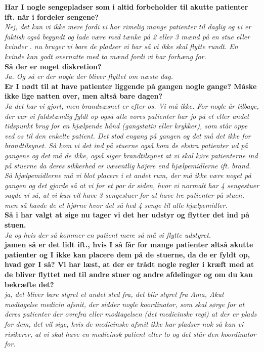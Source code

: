 \noindent
\textbf{Har I nogle sengepladser som i altid forbeholder til akutte patienter ift. når i fordeler sengene?}\\
\noindent
\textit{ Nej, det kan vi ikke mere fordi vi har rimelig mange patienter til daglig og vi er faktisk også begyndt og lade være med tænke på 2 eller 3 mænd på en stue eller kvinder . nu bruger vi bare de pladser vi har så vi ikke skal flytte rundt. En kvinde kan godt overnatte med to mænd fordi vi har forhæng for.}\\
\noindent
\textbf{Så der er noget diskretion?}\\
\noindent
\textit{Ja. Og så er der nogle der bliver flyttet om næste dag.}\\
\noindent
\textbf{Er I nødt til at have patienter liggende på gangen nogle gange? Måske ikke lige natten over, men altså bare dagen?}\\
\noindent
\textit{Ja det har vi gjort, men brandvæsnet er efter os. Vi må ikke. For nogle år tilbage, der var vi fuldstændig fyldt op også alle vores patienter har jo på et eller andet tidspunkt brug for en hjælpende hånd (gangstativ eller krykker), som står oppe ved os til den enkelte patient. Det stod engang på gangen og det må det ikke for brandtilsynet. Så kom vi det ind på stuerne også kom de ekstra patienter ud på gangene og det må de ikke, også siger brandtilsynet at vi skal køre patienterne ind på stuerne da deres sikkerhed er væsentlig højere end hjælpemidlerne ift. brand. Så hjælpemidlerne må vi blot placere i et andet rum, der må ikke være noget på gangen og det gjorde så at vi for et par år siden, hvor vi normalt har 4 sengestuer sagde vi så, at vi kun vil have 3 sengestuer for at have tre patienter på stuen, men så havde de et hjørne hvor det så hed 4 senge til alle hjælpemidler.}\\
\noindent
\textbf{Så i har valgt at sige nu tager vi det her udstyr og flytter det ind på stuen.}\\
\noindent
\textit{Ja og hvis der så kommer en patient mere så må vi flytte udstyret.}\\
\noindent
\textbf{jamen så er det lidt ift., hvis I så får for mange patienter altså akutte patienter og I ikke kan placere dem på de stuerne, da de er fyldt op, hvad gør I så? Vi har læst, at der er trådt nogle regler i kræft med at de bliver flyttet ned til andre stuer og andre afdelinger og om du kan bekræfte det?}\\
\noindent
\textit{ja, det bliver bare styret et andet sted fra, det blir styret fra Ama, Akut modtagelse medicin afsnit, der sidder nogle koordinator, som skal sørge for at deres patienter der ovrefra eller modtagelsen (det medicinske regi) at der er plads for dem, det vil sige, hvis de medicinske afsnit ikke har pladser nok så kan vi risikerer, at vi skal have en medicinsk patient eller to og det står den koordinator for.} \\
